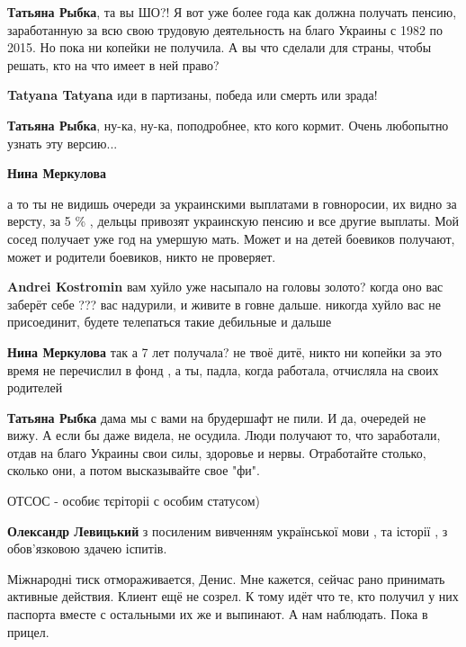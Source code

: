 \begin{itemize}
\begin{itemize}

\textbf{Татьяна Рыбка}, та вы ШО?! Я вот уже более года как должна получать пенсию, заработанную за всю свою трудовую деятельность на благо Украины с 1982 по 2015. Но пока ни копейки не получила. А вы что сделали для страны, чтобы решать, кто на что имеет в ней право?

\textbf{Tatyana Tatyana} иди в партизаны, победа или смерть или зрада!

\textbf{Татьяна Рыбка}, ну-ка, ну-ка, поподробнее, кто кого кормит. Очень любопытно узнать эту версию...

\textbf{Нина Меркулова} 

а то ты не видишь очереди за украинскими выплатами в говноросии, их видно за
версту, за 5 \% , дельцы привозят украинскую пенсию и все другие выплаты. Мой
сосед получает уже год на умершую мать. Может и на детей боевиков получают,
может и родители боевиков, никто не проверяет.


\textbf{Andrei Kostromin} вам хуйло уже насыпало на головы золото? когда оно вас заберёт себе ??? вас надурили, и живите в говне дальше. никогда хуйло вас не присоединит, будете телепаться такие дебильные и дальше

\textbf{Нина Меркулова} так а 7 лет получала? не твоё дитё, никто ни копейки за это время не перечислил в фонд , а ты, падла, когда работала, отчисляла на своих родителей

\textbf{Татьяна Рыбка} дама мы с вами на брудершафт не пили. И да, очередей не вижу. А если бы даже видела, не осудила. Люди получают то, что заработали, отдав на благо Украины свои силы, здоровье и нервы. Отработайте столько, сколько они, а потом высказывайте свое "фи".

\end{itemize} %

ОТСОС - особиє тєріторіі с особим статусом)

\begin{itemize} %
\textbf{Олександр Левицький} з посиленим вивченням української мови , та історії , з обов'язковою здачею іспитів.
\end{itemize} %


Міжнародні тиск отмораживается, Денис. Мне кажется, сейчас рано принимать
активные действия. Клиент ещё не созрел. К тому идёт что те, кто получил у них
паспорта вместе с остальными их же и выпинают. А нам наблюдать. Пока в прицел.



\end{itemize}
